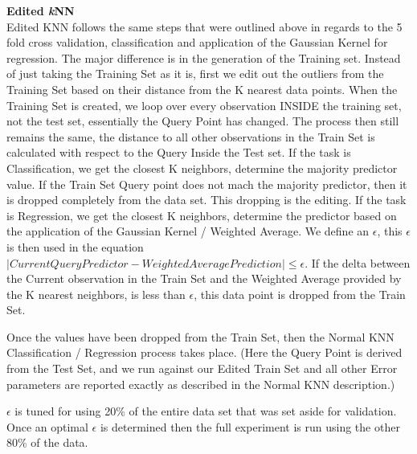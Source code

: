 \documentclass[twoside,11pt]{article}
\begin{document}
\textbf{Edited \textit{k}NN}\\
\hspace*{10mm} Edited KNN follows the same steps that were outlined above in regards to the 5 fold cross validation, classification and application of the Gaussian Kernel for regression. The major difference is in the generation of the Training set. Instead of just taking the Training Set as it is, first we edit out the outliers from the Training Set based on their distance from the K nearest data points. 
When the Training Set is created, we loop over every observation INSIDE the training set, not the test set, essentially the Query Point has changed. The process then still remains the same, the distance to all other observations in the Train Set is calculated with respect to the Query Inside the Test set.\newline 
If the task is Classification, we get the closest K neighbors, determine the majority predictor value. If the Train Set Query point does not mach the majority predictor, then it is dropped completely from the data set. This dropping is the editing. 
If the task is Regression, we get the closest K neighbors, determine the predictor based on the application of the Gaussian Kernel / Weighted Average. We define an $\epsilon$, this $\epsilon$ is then used in the equation $|Current Query Predictor - Weighted Average Prediction| \leq \epsilon$.\newline
If the delta between the Current observation in the Train Set and the Weighted Average provided by the K nearest neighbors, is less than $\epsilon$, this data point is dropped from the Train Set.\newline

Once the values have been dropped from the Train Set, then the Normal KNN Classification / Regression process takes place. (Here the Query Point is derived from the Test Set, and we run against our Edited Train Set and all other Error parameters are reported exactly as described in the Normal KNN description.)\newline

$\epsilon$ is tuned for using 20\% of the entire data set that was set aside for validation. Once an optimal $\epsilon$ is determined then the full experiment is run using the other 80\% of the data.\newline
\end{document}
